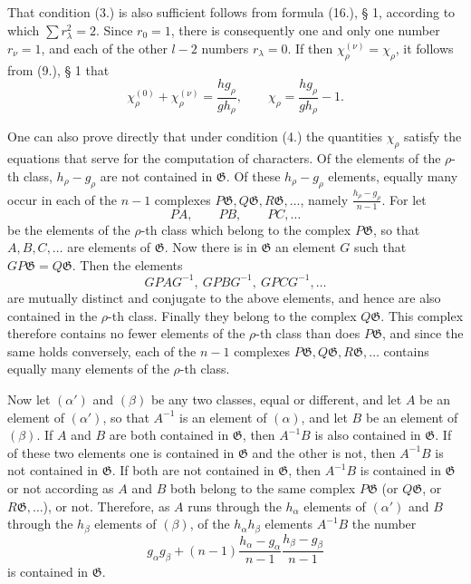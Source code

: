 \documentclass[11pt]{article}
\newcommand{\Ggr}{\mathfrak{G}}
\begin{document}
That condition (3.) is also sufficient follows from formula (16.), § 1, according to which $\sum r_\lambda^2=2$. Since $r_0=1$, there is consequently one and only one number $r_\nu=1$, and each of the other $l-2$ numbers $r_\lambda=0$. If then $\chi_\rho^{(\nu)}=\chi_\rho$, it follows from (9.), § 1 that
\[
  \chi_\rho^{(0)}+\chi_\rho^{(\nu)}
  =
  \frac{h g_\rho}{g h_\rho},
  \qquad
  \chi_\rho=\frac{h g_\rho}{g h_\rho}-1.
\]

One can also prove directly that under condition (4.) the quantities $\chi_\rho$ satisfy the equations that serve for the computation of characters. Of the elements of the $\rho$-th class, $h_\rho-g_\rho$ are not contained in $\Ggr$. Of these $h_\rho-g_\rho$ elements, equally many occur in each of the $n-1$ complexes $P\Ggr,Q\Ggr,R\Ggr,\ldots$, namely $\frac{h_\rho-g_\rho}{n-1}$. For let
\[
  PA,\qquad PB,\qquad PC,\ldots
\]
be the elements of the $\rho$-th class which belong to the complex $P\Ggr$, so that $A,B,C,\ldots$ are elements of $\Ggr$. Now there is in $\Ggr$ an element $G$ such that $GP\Ggr=Q\Ggr$. Then the elements
\[
  GPAG^{-1},\ GPBG^{-1},\ GPCG^{-1},\ldots
\]
are mutually distinct and conjugate to the above elements, and hence are also contained in the $\rho$-th class. Finally they belong to the complex $Q\Ggr$. This complex therefore contains no fewer elements of the $\rho$-th class than does $P\Ggr$, and since the same holds conversely, each of the $n-1$ complexes $P\Ggr,Q\Ggr,R\Ggr,\ldots$ contains equally many elements of the $\rho$-th class.

Now let $(\alpha')$ and $(\beta)$ be any two classes, equal or different, and let $A$ be an element of $(\alpha')$, so that $A^{-1}$ is an element of $(\alpha)$, and let $B$ be an element of $(\beta)$. If $A$ and $B$ are both contained in $\Ggr$, then $A^{-1}B$ is also contained in $\Ggr$. If of these two elements one is contained in $\Ggr$ and the other is not, then $A^{-1}B$ is not contained in $\Ggr$. If both are not contained in $\Ggr$, then $A^{-1}B$ is contained in $\Ggr$ or not according as $A$ and $B$ both belong to the same complex $P\Ggr$ (or $Q\Ggr$, or $R\Ggr,\ldots$), or not. Therefore, as $A$ runs through the $h_\alpha$ elements of $(\alpha')$ and $B$ through the $h_\beta$ elements of $(\beta)$, of the $h_\alpha h_\beta$ elements $A^{-1}B$ the number
\[
  g_\alpha g_\beta+(n-1)\frac{h_\alpha-g_\alpha}{n-1}\frac{h_\beta-g_\beta}{n-1}
\]
is contained in $\Ggr$.
\end{document}
